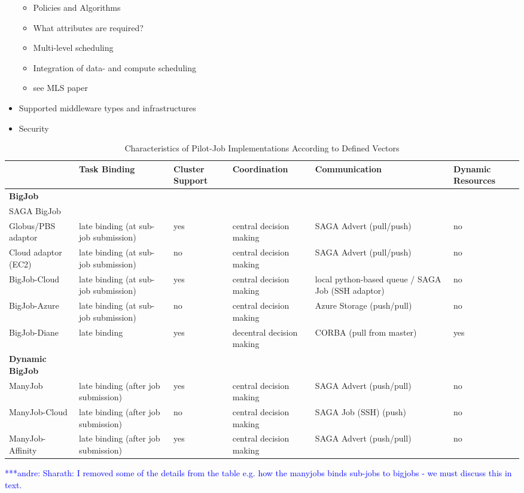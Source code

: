 \documentclass[]{article}
\newcommand{\alnote}[1]{ {\textcolor{blue} { ***andre: #1 }}}
\newcommand{\alnote}[1]{}
\begin{document}
\begin{itemize}
	\begin{itemize}
	 			\item Policies and Algorithms
	 			\item What attributes are required?
	 			\item Multi-level scheduling
	 			\item Integration of data- and compute scheduling
	 			\item see MLS paper
	\end{itemize}
	
	\item Supported middleware types and infrastructures	
	\item Security
\end{itemize}


\begin{table}[t]
\begin{tabular}{|l|p{2.5cm}|p{2cm}|p{2cm}|p{2cm}|p{2cm}|}
	\hline
	&\textbf{Task Binding} &\textbf{Cluster Support} &\textbf{Coordina\-tion} & \textbf{Communica\-tion} &\textbf{Dynamic Resources}\\
	\hline
	\textbf{BigJob} & &&&&\\
	\hline
	SAGA BigJob & &&&&\\
	\hline
	\hspace{4mm} Globus/PBS adaptor  &late binding (at sub-job submission)  
									 &yes &central decision making &SAGA Advert (pull/push) &no\\  
	\hline
	\hspace{4mm} Cloud adaptor (EC2) &late binding (at sub-job submission)  
									 &no &central decision making &SAGA Advert (pull/push) &no\\ 
	\hline
 	BigJob-Cloud &late binding (at sub-job submission) &yes &central decision making 
				 &local python-based queue / SAGA Job (SSH adaptor) &no\\ 
	\hline
	BigJob-Azure &late binding (at sub-job submission)
	             &no &central decision making &Azure Storage (push/pull) &no\\ 
	\hline
    BigJob-Diane &late binding  &yes &decentral decision making &CORBA (pull from master) &yes\\ 
	\hline	
	\textbf{Dynamic BigJob} & &&&&\\
	\hline
    ManyJob &late binding (after job submission) &yes &central decision making &SAGA Advert (push/pull) &no\\
	\hline
 	ManyJob-Cloud &late binding (after job submission) &no &central decision making &SAGA Job (SSH) (push) &no\\
	\hline 
	ManyJob-Affinity &late binding (after job submission)
	&yes &central decision making &SAGA Advert (push/pull) &no\\
	\hline
\end{tabular}
\caption{Characteristics of Pilot-Job Implementations According 
		to Defined Vectors}
\end{table}		
\alnote{Sharath: I removed some of the details from the table e.g. how the 
manyjobs binds sub-jobs to bigjobs - we must discuss this in text.}
		
\end{document}
